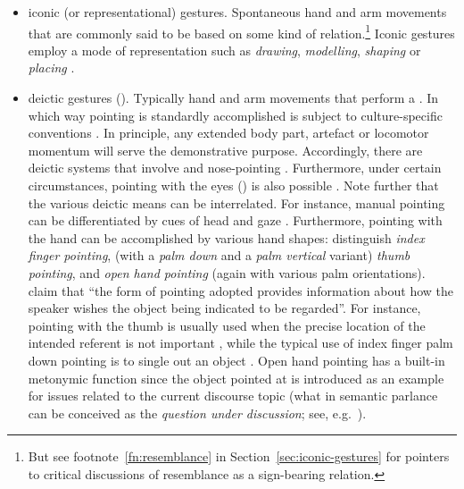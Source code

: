 \documentclass[output=paper
 	        ,biblatex
                ,babelshorthands
                ,newtxmath
                ,draftmode
                ,colorlinks, citecolor=brown
]{langscibook}
\begin{document}
\begin{itemize}
\item iconic (or representational) gestures. Spontaneous hand and arm movements that are commonly said to be based on some kind of  relation.\footnote{But see footnote~\ref{fn:resemblance} in Section~\ref{sec:iconic-gestures} for pointers to critical discussions of resemblance as a sign-bearing relation.} Iconic gestures employ a mode of representation such as \textit{drawing}, \textit{modelling}, \textit{shaping} or \textit{placing} \citep{Streeck:2008,Mueller:1998}.
\item deictic gestures (). Typically hand and arm movements that perform a . 
%
In which way pointing is standardly accomplished is subject to culture-specific conventions \citep{Wilkins:2003}. 
%
In principle, any extended body part, artefact or locomotor momentum will serve the demonstrative purpose. 
%
Accordingly, there are deictic systems that involve  \citep{Enfield:2001} and nose-pointing \citep{Cooperrider:Nunez:2012}. 
%
Furthermore, under certain circumstances, pointing with the eyes () is also possible \citep{Hadjikhani:Hoge:Snyder:de:Gelder:2008}. 
%
Note further that the various deictic means can be interrelated. For instance, manual pointing can be differentiated by cues of head and gaze \citep{Butterworth:Itakura:2000}.
%
Furthermore, pointing with the hand can be accomplished by various hand shapes: \citet{Kendon:Versante:2003} distinguish \emph{index finger pointing}, (with a \emph{palm down} and a \emph{palm vertical} variant) \emph{thumb pointing}, and \emph{open hand pointing} (again with various palm orientations).
%
\citet[]{Kendon:Versante:2003} claim that \enquote{the form of pointing adopted provides information about how the speaker wishes the object being indicated to be regarded}.
%
For instance, pointing with the thumb is usually used when the precise location of the intended referent is not important \citep[--125]{Kendon:Versante:2003}, while the typical use of index finger palm down pointing is to single out an object \citep[]{Kendon:Versante:2003}. 
%
Open hand pointing has a built-in metonymic function since the object pointed at is introduced as an example for issues related to the current discourse topic (what in semantic parlance can be conceived as the \emph{question under discussion}; see, e.g.\ \citealp{Ginzburg:2012}).

\end{itemize}
\end{document}
